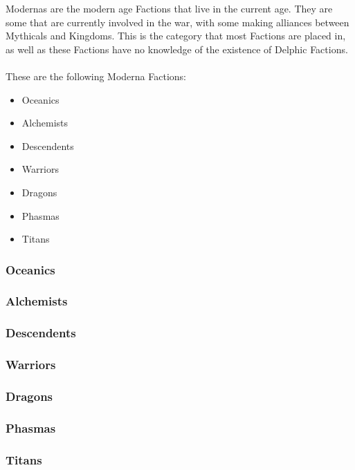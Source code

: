 Modernas are the modern age Factions that live in the current age. They are some that are currently 
involved in the war, with some making alliances between Mythicals and Kingdoms. This is the 
category that most Factions are placed in, as well as these Factions have no knowledge of 
the existence of Delphic Factions. 
\\\\
These are the following Moderna Factions: 
\begin{itemize}
    \item Oceanics 
    \item Alchemists
    \item Descendents
    \item Warriors
    \item Dragons
    \item Phasmas
    \item Titans
\end{itemize}

\subsubsection{Oceanics}

\subsubsection{Alchemists}

\subsubsection{Descendents}

\subsubsection{Warriors}

\subsubsection{Dragons}

\subsubsection{Phasmas}

\subsubsection{Titans}